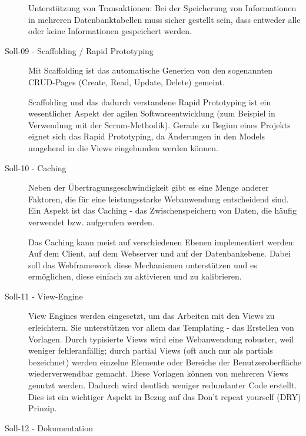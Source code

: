 \begin{description}
    Unterstützung von Transaktionen: Bei der Speicherung von Informationen in
    mehreren Datenbanktabellen muss sicher gestellt sein, dass entweder alle
    oder keine Informationen gespeichert werden.

    \item[Soll-09 - Scaffolding / Rapid Prototyping\label{itm:Soll-09}]

    Mit Scaffolding ist das automatische Generien von den sogenannten CRUD-Pages
    (Create, Read, Update, Delete) gemeint.

    Scaffolding und das dadurch verstandene Rapid Prototyping ist ein
    wesentlicher Aspekt der agilen Softwareentwicklung (zum Beispiel in
    Verwendung mit der Scrum-Methodik). Gerade zu Beginn eines Projekts eignet
    sich das Rapid Prototyping, da Änderungen in den Models umgehend in die
    Views eingebunden werden können.

    \item[Soll-10 - Caching\label{itm:Soll-10}]

    Neben der Übertragunsgeschwindigkeit gibt es eine Menge anderer Faktoren,
    die für eine leistungsstarke Webanwendung entscheidend sind. Ein Aspekt ist
    das Caching - das Zwischenspeichern von Daten, die häufig verwendet bzw.
    aufgerufen werden.

    Das Caching kann meist auf verschiedenen Ebenen implementiert werden: Auf
    dem Client, auf dem Webserver und auf der Datenbankebene. Dabei soll das
    Webframework diese Mechanismen unterstützen und es ermöglichen, diese
    einfach zu aktivieren und zu kalibrieren.  

    \item[Soll-11 - View-Engine\label{itm:Soll-11}]

    View Engines werden eingesetzt, um das Arbeiten mit den Views zu
    erleichtern. Sie unterstützen vor allem das Templating - das Erstellen von
    Vorlagen. Durch typisierte Views wird eine Webanwendung robuster, weil
    weniger fehleranfällig; durch partial Views (oft auch nur als partials
    bezeichnet) werden einzelne Elemente oder Bereiche der Benutzeroberfläche
    wiederverwendbar gemacht. Diese Vorlagen können von mehreren Views genutzt
    werden. Dadurch wird deutlich weniger redundanter Code erstellt. Dies ist
    ein wichtiger Aspekt in Bezug auf das Don’t repeat yourself (DRY) Prinzip.

    \item[Soll-12 - Dokumentation\label{itm:Soll-12}]


\end{description}
